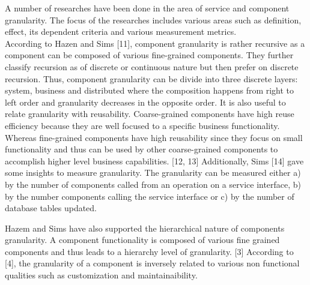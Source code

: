 A number of researches have been done in the area of service and component granularity. The focus of the researches includes various areas such as definition, effect, its dependent criteria and various measurement metrics.
\\
According to Hazen and Sims [11], component granularity is rather recursive as a component can be composed of various fine-grained components. They further classify recursion as of discrete or continuous nature but then prefer on discrete recursion. Thus, component granularity can be divide into three discrete layers: system, business and distributed where the composition happens from right to left order and granularity decreases in the opposite order.
It is also useful to relate granularity with reusability. Coarse-grained components have high reuse efficiency because they are well focused to a specific business functionality. Whereas fine-grained components have high reusability since they focus on small functionality and thus can be used by other coarse-grained components to accomplish higher level business capabilities. [12, 13]
Additionally, Sims [14] gave some insights to measure granularity. The granularity can be measured either a) by the number of components called from an operation on a service interface, b) by the number components calling the service interface or c) by the number of database tables updated.


Hazem and Sims have also supported the hierarchical nature of components granularity. A component functionality is composed of various fine grained components and thus leads to a hierarchy level of granularity. [3]
According to [4], the granularity of a component is inversely related to various non functional qualities such as customization and maintainaibility. 

